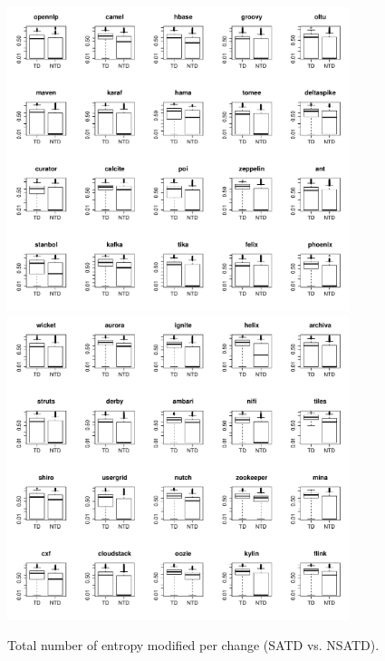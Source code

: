 \begin{figure}[tb]
	\centering
	\includegraphics[width=100mm]{figures/chapter4/rq3_td_entropy_logged_1}
	\includegraphics[width=100mm]{figures/chapter4/rq3_td_entropy_logged_2}
	\caption{Total number of entropy modified per change (SATD vs. NSATD).}
	\label{figure:total_entropy_td_vs_ntd}
\end{figure}


